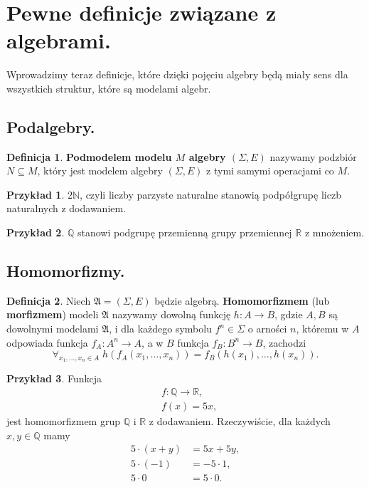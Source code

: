 \documentclass{article}
\theoremstyle{definition}
\newtheorem{definition}{Definicja}[section]
\newtheorem{example}{Przykład}[section]
\begin{document}
\section{Pewne definicje związane z algebrami.}

Wprowadzimy teraz definicje,
	które dzięki pojęciu algebry będą miały sens dla wszystkich struktur,
	które są modelami algebr.

\subsection{Podalgebry.}

\begin{definition}
    \textbf{Podmodelem modelu $M$ algebry $(\Sigma, E)$} nazywamy podzbiór $N \subseteq M$,
		który jest modelem algebry $(\Sigma, E)$ z tymi samymi operacjami co $M$.
\end{definition}

\begin{example}
	$2\mathbb{N}$, czyli liczby parzyste naturalne stanowią podpółgrupę liczb naturalnych z dodawaniem.
\end{example}
\begin{example}
	$\mathbb{Q}$ stanowi podgrupę przemienną grupy przemiennej $\mathbb{R}$ z mnożeniem.
\end{example}

\subsection{Homomorfizmy.}

\begin{definition}
    Niech $\mathfrak{A} = (\Sigma, E)$ będzie algebrą.
	\textbf{Homomorfizmem} (lub \textbf{morfizmem}) modeli $\mathfrak{A}$ nazywamy dowolną funkcję
		$h: A \to B$, gdzie $A, B$ są dowolnymi modelami $\mathfrak{A}$,
		i dla każdego symbolu $f^n \in \Sigma$ o arności $n$,
			któremu w $A$ odpowiada funkcja $f_A: A^n \to A$,
			a w $B$ funkcja $f_B: B^n \to B$,
		 zachodzi
	\begin{equation}
		\forall_{x_1, \dots, x_n \in A} \; h(f_A(x_1, \dots, x_n)) = f_B(h(x_1), \dots, h(x_n)).
	\end{equation}
\end{definition}

\begin{example}
	Funkcja
	\begin{align*}
		&f: \mathbb{Q} \to \mathbb{R},\\
		&f(x) = 5x,
	\end{align*}
	jest homomorfizmem grup $\mathbb{Q}$ i $\mathbb{R}$ z dodawaniem.
	Rzeczywiście, dla każdych $x, y \in \mathbb{Q}$ mamy
	\begin{align}
		5 \cdot (x + y) &= 5x + 5y, \\
		5 \cdot (-1) &= -5 \cdot 1, \\
		5 \cdot 0 &= 5 \cdot 0.
	\end{align}
\end{example}
\end{document}
